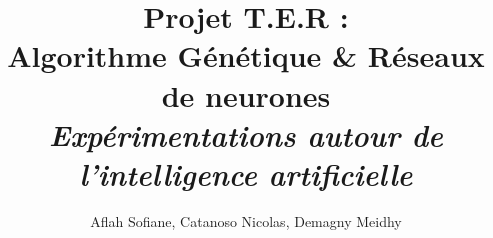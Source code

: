\title{Projet T.E.R : \\ Algorithme Génétique \& Réseaux de neurones \\ \emph{Expérimentations autour de l'intelligence artificielle} }
\author{Aflah Sofiane, Catanoso Nicolas, Demagny Meidhy}

\pagebreak
